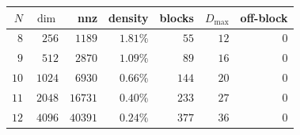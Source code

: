 \begin{tabular}{rrrrrrr}
\hline
$N$ & $\dim$ & nnz & density & blocks & $D_{\max}$ & off-block \\
\hline
$8$ & $256$ & $1189$ & $1.81\%$ & $55$ & $12$ & $0$ \\
$9$ & $512$ & $2870$ & $1.09\%$ & $89$ & $16$ & $0$ \\
$10$ & $1024$ & $6930$ & $0.66\%$ & $144$ & $20$ & $0$ \\
$11$ & $2048$ & $16731$ & $0.40\%$ & $233$ & $27$ & $0$ \\
$12$ & $4096$ & $40391$ & $0.24\%$ & $377$ & $36$ & $0$ \\
\hline
\end{tabular}
